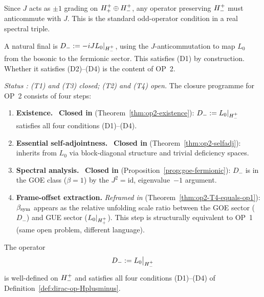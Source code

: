 \begin{remark}
Since $J$ acts as $\pm 1$ grading on $H^+_+\oplus H^+_-$,
any operator preserving $H^+_-$ must anticommute with $J$.
This is the standard odd-operator condition in a real spectral triple.
\end{remark}

\begin{remark}
A natural final is $D_{-}:=-iJ L_0|_{H^+_-}$, using the
$J$-anticommutation to map $L_0$ from the bosonic to the fermionic
sector. This satisfies (D1) by construction. Whether it satisfies
(D2)--(D4) is the content of OP~2.
\end{remark}

\begin{proposition}
\label{prop:op2-targets}
\emph{Status : (T1) and (T3) closed; (T2) and (T4) open.}
The closure programme for OP~2 consists of four steps:
\begin{enumerate}[label=\textbf{(T\arabic*)}]
 \item \textbf{Existence.} \checkmark\ \textbf{Closed in }
 (Theorem~\ref{thm:op2-existence}): $D_{-} := L_0|_{H^+_-}$
 satisfies all four conditions (D1)--(D4).
 \item \textbf{Essential self-adjointness.} \checkmark\ \textbf{Closed in
 } (Theorem~\ref{thm:op2-selfadj}): inherits from $L_0$ via
 block-diagonal structure and trivial deficiency spaces.
 \item \textbf{Spectral analysis.} \checkmark\ \textbf{Closed in
 } (Proposition~\ref{prop:goe-fermionic}): $D_{-}$ is in the
 GOE class ($\beta=1$) by the $J^2=\mathrm{id}$, eigenvalue~$-1$
 argument.
 \item \textbf{Frame-offset extraction.} \emph{Reframed in }
 (Theorem~\ref{thm:op2-T4-equals-op1}): $\beta_{\mathrm{sym}}$ appears as the
 relative unfolding scale ratio between the GOE sector ($D_{-}$)
 and GUE sector ($L_0|_{H^+_+}$). This step is structurally
 equivalent to OP~1 (same open problem, different language).
\end{enumerate}
\end{proposition}

\begin{theorem}[OP~2 (T1): Existence of $D_{-}$]
\label{thm:op2-existence}
The operator
\[
 D_{-} := L_0\big|_{H^+_-}
\]
is well-defined on $H^+_-$ and satisfies all four conditions
(D1)--(D4) of Definition~\ref{def:dirac-op-Hplusminus}.
\end{theorem}

